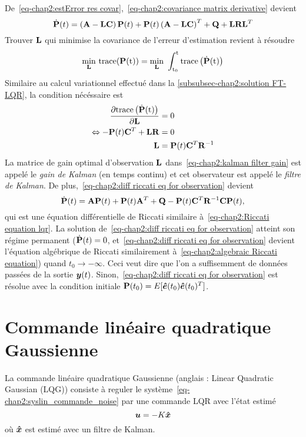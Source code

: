 De~\eqref{eq-chap2:estError res covar},~\eqref{eq-chap2:covariance matrix derivative} devient
\begin{equation}\label{eq-chap2:diff riccati eq for observation}
	\dot{\mathbf{P}}(t) = \left(\mathbf{A}-\mathbf{L}\mathbf{C}\right)\mathbf{P}(t) + \mathbf{P}(t)\left(\mathbf{A}-\mathbf{L}\mathbf{C}\right)^T+\mathbf{Q}+\mathbf{L}\mathbf{R}\mathbf{L}^T
\end{equation}
 Trouver $\mathbf{L}$ qui minimise la covariance de l'erreur d'estimation revient à résoudre 
\begin{equation}
	\underset{\mathbf{L}}{\min}~\rm{trace}(\mathbf{P}(t)) = \underset{\mathbf{L}}{\min}~\int_{t_0}^{t}\rm{trace}\left(\dot{\mathbf{P}}(t)\right)
\end{equation}
Similaire au calcul variationnel effectué dans la \cref{subsubsec-chap2:solution FT-LQR}, la condition nécéssaire est 
\begin{align}\label{eq-chap2:kalman filter gain}
	\begin{split}
		\frac{\partial \rm{trace}\left(\dot{\mathbf{P}}(t)\right)}{\partial \mathbf{L}}&=0\\
		\Leftrightarrow -\mathbf{P}(t)\mathbf{C}^T+ \mathbf{L}\mathbf{R}&=0 \\ 
		\mathbf{L} &= \mathbf{P}(t)\mathbf{C}^T\mathbf{R}^{-1}
	\end{split}
\end{align}
La matrice de gain optimal d'observation  $\mathbf{L}$ dans~\eqref{eq-chap2:kalman filter gain} est appelé le \emph{gain de Kalman} (en temps continu) et cet observateur est appelé le \emph{filtre de Kalman}. De plus,~\eqref{eq-chap2:diff riccati eq for observation} devient 
\begin{equation}
	\dot{\mathbf{P}}(t) = \mathbf{A}\mathbf{P}(t) + \mathbf{P}(t)\mathbf{A}^T+\mathbf{Q}-\mathbf{P}(t)\mathbf{C}^T\mathbf{R}^{-1}\mathbf{C}\mathbf{P}(t),
\end{equation}
qui est une équation différentielle de Riccati similaire à~\eqref{eq-chap2:Riccati equation lqr}. La solution de~\eqref{eq-chap2:diff riccati eq for observation} atteint son régime permanent ($\dot{\mathbf{P}}(t)=0$, et~\eqref{eq-chap2:diff riccati eq for observation} devient l'équation algébrique de Riccati similairement à~\eqref{eq-chap2:algebraic Riccati equation}) quand $t_0\rightarrow-\infty$. Ceci veut dire que l'on a suffisemment de données passées de la sortie $\bm{y}(t)$. Sinon,~\eqref{eq-chap2:diff riccati eq for observation} est résolue avec la condition initiale $\mathbf{P}(t_0)=E[\bm{\hat{e}}(t_0)\bm{\hat{e}}(t_0)^T]$.
\section{Commande linéaire quadratique Gaussienne}
La commande linéaire quadratique Gaussienne (anglais : Linear Quadratic Gaussian (LQG)) consiste à reguler le système~\eqref{eq-chap2:syslin_commande_noise} par une commande LQR avec l'état estimé  
\begin{equation}
	\bm{u}=-K\bm{\hat{x}}
\end{equation}
où $\bm{\hat{x}}$ est estimé avec un filtre de Kalman.
